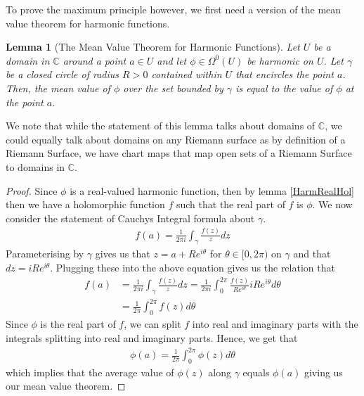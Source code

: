 \documentclass[11pt]{report}
\newtheorem{lemma}[thm]{Lemma}
\theoremstyle{definition}
\begin{document}
To prove the maximum principle however, we first need a version of the mean value theorem for harmonic functions.
\begin{lemma}[The Mean Value Theorem for Harmonic Functions]\label{MVT}
  Let $U$ be a domain in $\mathbb{C}$ around a point $a \in U$ and let $\phi \in \Omega^0(U)$ be harmonic on $U$. Let $\gamma$ be a closed circle of radius $R > 0$ contained within $U$ that encircles the point $a$. Then, the mean value of $\phi$ over the set bounded by $\gamma$ is equal to the value of $\phi$ at the point $a$. 
\end{lemma}
We note that while the statement of this lemma talks about domains of $\mathbb{C}$, we could equally talk about domains on any Riemann surface as by definition of a Riemann Surface, we have chart maps that map open sets of a Riemann Surface to domains in $\mathbb{C}$. 
\begin{proof}
  Since $\phi$ is a real-valued harmonic function, then by lemma \ref{HarmRealHol} then we have a holomorphic function $f$ such that the real part of $f$ is $\phi$. We now consider the statement of Cauchys Integral formula about $\gamma$.
  \begin{align*}
    f(a) = \frac{1}{2\pi i}\int_{\gamma}\frac{f(z)}{z}dz
  \end{align*}
  Parameterising by $\gamma$ gives us that $z= a + Re^{i\theta}$ for $\theta \in [0, 2\pi)$ on $\gamma$ and that $dz = iRe^{i\theta}$. Plugging these into the above equation gives us the relation that
  \begin{align*}
    f(a) &= \frac{1}{2\pi i}\int_{\gamma}\frac{f(z)}{z}dz = \frac{1}{2\pi i}\int_0^{2\pi}\frac{f(z)}{Re^{i\theta}}iRe^{i\theta}d\theta \\
    &= \frac{1}{2\pi}\int_0^{2\pi}f(z)d\theta
  \end{align*}
  Since $\phi$ is the real part of $f$, we can split $f$ into real and imaginary parts with the integrals splitting into real and imaginary parts. Hence, we get that 
  \begin{align*}
    \phi(a)=\frac{1}{2\pi}\int_0^{2\pi}\phi(z)d\theta
  \end{align*}
    which implies that the average value of $\phi(z)$ along $\gamma$ equals $\phi(a)$ giving us our mean value theorem.
\end{proof}
\end{document}

